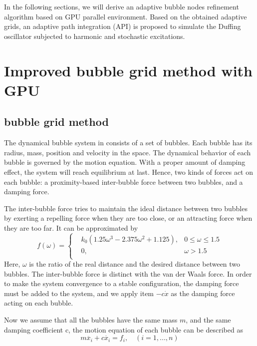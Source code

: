 \documentclass[a4paper, 11pt, final]{article}
\begin{document}
In the following sections, we will derive an adaptive bubble nodes
refinement algorithm based on GPU parallel environment. Based on the
obtained adaptive grids, an adaptive path integration (API) is proposed to
simulate the Duffing oscillator subjected to harmonic and stochastic
excitations.

\section{Improved bubble grid method with GPU}
\subsection{bubble grid method}
The dynamical bubble system in \cite{12} consists of a set of
bubbles. Each bubble has its radius, mass, position and velocity in
the space. The dynamical behavior of each bubble is governed by the
motion equation. With a proper amount of damping effect, the system
will reach equilibrium at last. Hence, two kinds of forces act on
each bubble: a proximity-based inter-bubble force between two
bubbles, and a damping force.

The inter-bubble force tries to maintain the ideal distance between
two bubbles by exerting a repelling force when they are too close,
or an attracting force when they are too far. It can be approximated
by
\begin{equation}
    \label{VDWF}
    f(\omega) = \left\{ \begin{aligned}
        & k_0(1.25\omega^3-2.375\omega^2+1.125), & 0 \leq \omega \leq 1.5 \\
        & 0, & \omega>1.5 \\
    \end{aligned} \right.
\end{equation}
Here, $\omega$ is the ratio of the real distance and the desired distance
between two bubbles. The inter-bubble force is distinct with the van der Waals force.
In order to make the system convergence to a stable configuration, the damping force
must be added to the system, and we apply item $-c\dot{x}$ as the damping force acting
on each bubble.

Now we assume that all the bubbles have the same mass $m$, and the same damping coefficient c,
the motion equation of each bubble can be described as
\begin{equation}
    \label{ME}
    m\ddot{x_i}+c\dot{x_i}=f_i,\quad (i=1,...,n)
\end{equation}
\end{document}
